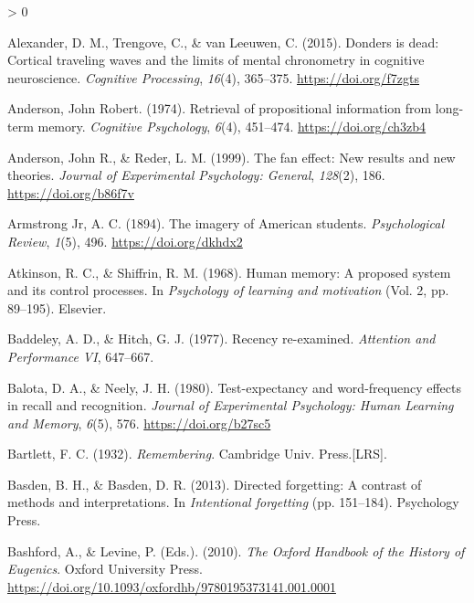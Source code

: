 \documentclass[
  oneside,
  12pt]{crumpbook}
\newlength{\cslhangindent}
\newenvironment{CSLReferences}[2] %
 {%
  \setlength{\parindent}{0pt}
  \ifodd #1 \everypar{\setlength{\hangindent}{\cslhangindent}}\ignorespaces\fi
  \ifnum #2 > 0
  \setlength{\parskip}{#2\baselineskip}
  \fi
 }%
 {}
\begin{document}
\hypertarget{refs}{}
\begin{CSLReferences}{1}{0}
\leavevmode\hypertarget{ref-alexanderDondersDeadCortical2015}{}%
Alexander, D. M., Trengove, C., \& van Leeuwen, C. (2015). Donders is dead: Cortical traveling waves and the limits of mental chronometry in cognitive neuroscience. \emph{Cognitive Processing}, \emph{16}(4), 365--375. \url{https://doi.org/f7zgts}

\leavevmode\hypertarget{ref-andersonRetrievalPropositionalInformation1974}{}%
Anderson, John Robert. (1974). Retrieval of propositional information from long-term memory. \emph{Cognitive Psychology}, \emph{6}(4), 451--474. \url{https://doi.org/ch3zb4}

\leavevmode\hypertarget{ref-andersonFanEffectNew1999}{}%
Anderson, John R., \& Reder, L. M. (1999). The fan effect: {New} results and new theories. \emph{Journal of Experimental Psychology: General}, \emph{128}(2), 186. \url{https://doi.org/b86f7v}

\leavevmode\hypertarget{ref-armstrongjrImageryAmericanStudents1894}{}%
Armstrong Jr, A. C. (1894). The imagery of {American} students. \emph{Psychological Review}, \emph{1}(5), 496. \url{https://doi.org/dkhdx2}

\leavevmode\hypertarget{ref-atkinsonHumanMemoryProposed1968}{}%
Atkinson, R. C., \& Shiffrin, R. M. (1968). Human memory: {A} proposed system and its control processes. In \emph{Psychology of learning and motivation} (Vol. 2, pp. 89--195). {Elsevier}.

\leavevmode\hypertarget{ref-baddeleyRecencyReexamined1977}{}%
Baddeley, A. D., \& Hitch, G. J. (1977). Recency re-examined. \emph{Attention and Performance VI}, 647--667.

\leavevmode\hypertarget{ref-balotaTestexpectancyWordfrequencyEffects1980}{}%
Balota, D. A., \& Neely, J. H. (1980). Test-expectancy and word-frequency effects in recall and recognition. \emph{Journal of Experimental Psychology: Human Learning and Memory}, \emph{6}(5), 576. \url{https://doi.org/b27sc5}

\leavevmode\hypertarget{ref-bartlettRemembering1932}{}%
Bartlett, F. C. (1932). \emph{Remembering}. {Cambridge Univ. Press.{[}LRS{]}}.

\leavevmode\hypertarget{ref-basdenDirectedForgettingContrast2013}{}%
Basden, B. H., \& Basden, D. R. (2013). Directed forgetting: {A} contrast of methods and interpretations. In \emph{Intentional forgetting} (pp. 151--184). {Psychology Press}.

\leavevmode\hypertarget{ref-bashfordOxfordHandbookHistory2010}{}%
Bashford, A., \& Levine, P. (Eds.). (2010). \emph{The {Oxford Handbook} of the {History} of {Eugenics}}. {Oxford University Press}. \url{https://doi.org/10.1093/oxfordhb/9780195373141.001.0001}


\end{CSLReferences}
\end{document}
